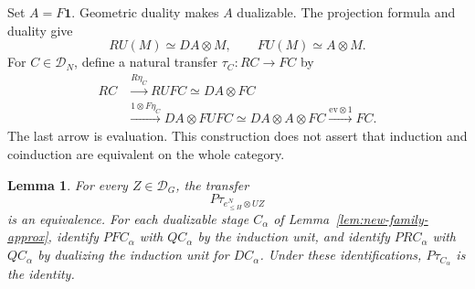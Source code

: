 \documentclass[11pt,reqno]{amsart}
\newtheorem{lemma}[theorem]{Lemma}
\theoremstyle{definition}
\theoremstyle{remark}
\theoremstyle{plain}
\numberwithin{equation}{section}
\newcommand{\one}{\mathbf 1}
\newcommand{\D}{\mathcal D}
\begin{document}
Set \(A=F\one\). Geometric duality makes \(A\) dualizable.
The projection formula and duality give
\[
 RU(M)\simeq DA\otimes M,\qquad
 FU(M)\simeq A\otimes M.
\]
For \(C\in\D_N\), define a natural transfer
\(\tau_C:RC\to FC\) by
\begin{equation}\label{eq:td-trace-transfer}
\begin{split}
 RC&\xrightarrow{R\eta_C}RUFC
       \simeq DA\otimes FC\\
   &\xrightarrow{1\otimes F\eta_C}
       DA\otimes FUF C
       \simeq DA\otimes A\otimes FC
     \xrightarrow{\mathrm{ev}\otimes1}FC.
\end{split}
\end{equation}
The last arrow is evaluation. This construction does not assert
that induction and coinduction are equivalent on the whole category.

\begin{lemma}\label{lem:td-transfer-normalization}
For every \(Z\in\D_G\), the transfer
\[
 P\tau_{e_{\le H}^N\otimes UZ}
\]
is an equivalence. For each dualizable stage \(C_\alpha\) of
Lemma~\ref{lem:new-family-approx}, identify \(PFC_\alpha\) with
\(QC_\alpha\) by the induction unit, and identify \(PRC_\alpha\)
with \(QC_\alpha\) by dualizing the induction unit for \(DC_\alpha\).
Under these identifications, \(P\tau_{C_\alpha}\) is the identity.
\end{lemma}
\end{document}
